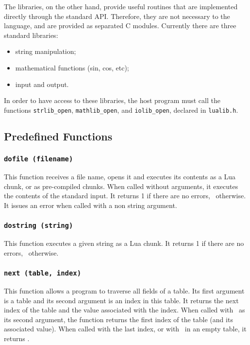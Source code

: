 The libraries, on the other hand, provide useful routines
that are implemented directly through the standard API.
Therefore, they are not necessary to the language,
and are provided as separated C modules.
Currently there are three standard libraries:
\begin{itemize}
\item string manipulation;
\item mathematical functions (sin, cos, etc);
\item input and output.
\end{itemize}
In order to have access to these libraries,
the host program must call the functions
\verb-strlib_open-, \verb-mathlib_open-, and \verb-iolib_open-,
declared in \verb-lualib.h-.


\subsection{Predefined Functions}

\subsubsection*{{\tt dofile (filename)}}
This function receives a file name,
opens it and executes its contents as a Lua chunk,
or as pre-compiled chunks.
When called without arguments,
it executes the contents of the standard input.
It returns 1 if there are no errors, \nil\ otherwise.
It issues an error when called with a non string argument.

\subsubsection*{{\tt dostring (string)}}
This function executes a given string as a Lua chunk.
It returns 1 if there are no errors, \nil\ otherwise.

\subsubsection*{{\tt next (table, index)}}
This function allows a program to traverse all fields of a table.
Its first argument is a table and its second argument
is an index in this table.
It returns the next index of the table and the
value associated with the index.
When called with \nil\ as its second argument,
the function returns the first index
of the table (and its associated value).
When called with the last index, or with \nil\ in an empty table,
it returns \nil.

